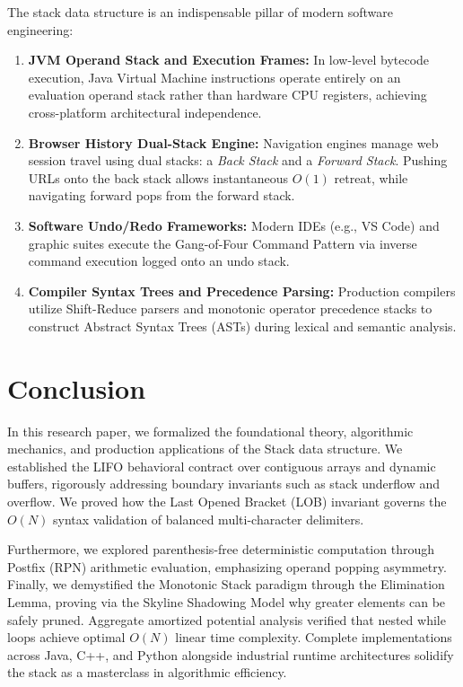 \documentclass[10pt,journal,compsoc,onecolumn]{IEEEtran}
\begin{document}
The stack data structure is an indispensable pillar of modern software engineering:
\begin{enumerate}
    \item \textbf{JVM Operand Stack and Execution Frames:} In low-level bytecode execution, Java Virtual Machine instructions operate entirely on an evaluation operand stack rather than hardware CPU registers, achieving cross-platform architectural independence.
    \item \textbf{Browser History Dual-Stack Engine:} Navigation engines manage web session travel using dual stacks: a \emph{Back Stack} and a \emph{Forward Stack}. Pushing URLs onto the back stack allows instantaneous $O(1)$ retreat, while navigating forward pops from the forward stack.
    \item \textbf{Software Undo/Redo Frameworks:} Modern IDEs (e.g., VS Code) and graphic suites execute the Gang-of-Four Command Pattern via inverse command execution logged onto an undo stack.
    \item \textbf{Compiler Syntax Trees and Precedence Parsing:} Production compilers utilize Shift-Reduce parsers and monotonic operator precedence stacks to construct Abstract Syntax Trees (ASTs) during lexical and semantic analysis.
\end{enumerate}

\section{Conclusion}
\label{sec:conclusion}

In this research paper, we formalized the foundational theory, algorithmic mechanics, and production applications of the Stack data structure. We established the LIFO behavioral contract over contiguous arrays and dynamic buffers, rigorously addressing boundary invariants such as stack underflow and overflow. We proved how the Last Opened Bracket (LOB) invariant governs the $O(N)$ syntax validation of balanced multi-character delimiters.

Furthermore, we explored parenthesis-free deterministic computation through Postfix (RPN) arithmetic evaluation, emphasizing operand popping asymmetry. Finally, we demystified the Monotonic Stack paradigm through the Elimination Lemma, proving via the Skyline Shadowing Model why greater elements can be safely pruned. Aggregate amortized potential analysis verified that nested while loops achieve optimal $O(N)$ linear time complexity. Complete implementations across Java, C++, and Python alongside industrial runtime architectures solidify the stack as a masterclass in algorithmic efficiency.
\end{document}
